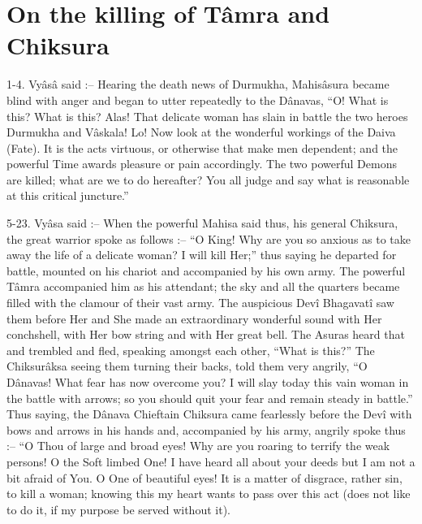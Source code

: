 ﻿\chapter{On the killing of T\^amra and Chiksura}

1-4. Vy\^as\^a said :-- Hearing the death news of Durmukha, Mahis\^asura became blind with anger and began to utter repeatedly to the D\^anavas, ``O! What is this? What is this? Alas! That delicate woman has slain in battle the two heroes Durmukha and V\^askala! Lo! Now look at the wonderful workings of the Daiva (Fate). It is the acts virtuous, or otherwise that make men dependent; and the powerful Time awards pleasure or pain accordingly. The two powerful Demons are killed; what are we to do hereafter? You all judge and say what is reasonable at this critical juncture.''

5-23. Vy\^asa said :-- When the powerful Mahisa said thus, his general Chiksura, the great warrior spoke as follows :-- ``O King! Why are you so anxious as to take away the life of a delicate woman? I will kill Her;'' thus saying he departed for battle, mounted on his chariot and accompanied by his own army. The powerful T\^amra accompanied him as his attendant; the sky and all the quarters became filled with the clamour of their vast army. The auspicious Dev\^i Bhagavat\^i saw them before Her and She made an extraordinary wonderful sound with Her conchshell, with Her bow string and with Her great bell. The Asuras heard that and trembled and fled, speaking amongst each other, ``What is this?'' The Chiksur\^aksa seeing them turning their backs, told them very angrily, ``O D\^anavas! What fear has now overcome you? I will slay today this vain woman in the battle with arrows; so you should quit your fear and remain steady in battle.'' Thus saying, the D\^anava Chieftain Chiksura came fearlessly before the Dev\^i with bows and arrows in his hands and, accompanied by his army, angrily spoke thus :-- ``O Thou of large and broad eyes! Why are you roaring to terrify the weak persons! O the Soft limbed One! I have heard all about your deeds but I am not a bit afraid of You. O One of beautiful eyes! It is a matter of disgrace, rather sin, to kill a woman; knowing this my heart wants to pass over this act (does not like to do it, if my purpose be served without it).

